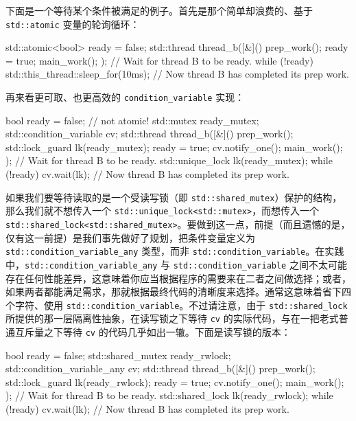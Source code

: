 下面是一个等待某个条件被满足的例子。首先是那个简单却浪费的、基于 \texttt{std::\allowbreak{}atomic} 变量的轮询循环：

\begin{codebox}[cpp]
    std::atomic<bool> ready = false;
    std::thread thread_b([&]() {
      prep_work();
      ready = true;
      main_work();
    });
    // Wait for thread B to be ready.
    while (!ready) {
      std::this_thread::sleep_for(10ms);
    }
    // Now thread B has completed its prep work.
\end{codebox}

再来看更可取、也更高效的 \texttt{condition\_\allowbreak{}variable} 实现：

\begin{codebox}[cpp]
    bool ready = false; // not atomic!
    std::mutex ready_mutex;
    std::condition_variable cv;
    std::thread thread_b([&]() {
      prep_work();
      {
        std::lock_guard lk(ready_mutex);
        ready = true;
      }
      cv.notify_one();
      main_work();
    });
    // Wait for thread B to be ready.
    {
      std::unique_lock lk(ready_mutex);
      while (!ready) {
        cv.wait(lk);
      }
    }
    // Now thread B has completed its prep work.
\end{codebox}

如果我们要等待读取的是一个受读写锁（即 \texttt{std::\allowbreak{}shared\_\allowbreak{}mutex}）保护的结构，那么我们就不想传入一个 \texttt{std::\allowbreak{}unique\_\allowbreak{}lock<\allowbreak{}std::\allowbreak{}mutex>\allowbreak{}}，而想传入一个 \texttt{std::\allowbreak{}shared\_\allowbreak{}lock<\allowbreak{}std::\allowbreak{}shared\_\allowbreak{}mutex>\allowbreak{}}。要做到这一点，前提（而且遗憾的是，仅有这一前提）是我们事先做好了规划，把条件变量定义为 \texttt{std::\allowbreak{}condition\_\allowbreak{}variable\_\allowbreak{}any} 类型，而非 \texttt{std::\allowbreak{}condition\_\allowbreak{}variable}。在实践中，\texttt{std::\allowbreak{}condition\_\allowbreak{}variable\_\allowbreak{}any} 与 \texttt{std::\allowbreak{}condition\_\allowbreak{}variable} 之间不太可能存在任何性能差异，这意味着你应当根据程序的需要来在二者之间做选择；或者，如果两者都能满足需求，那就根据最终代码的清晰度来选择。通常这意味着省下四个字符、使用 \texttt{std::\allowbreak{}condition\_\allowbreak{}variable}。不过请注意，由于 \texttt{std::\allowbreak{}shared\_\allowbreak{}lock} 所提供的那一层隔离性抽象，在读写锁之下等待 \texttt{cv} 的实际代码，与在一把老式普通互斥量之下等待 \texttt{cv} 的代码几乎如出一辙。下面是读写锁的版本：

\begin{codebox}[cpp]
    bool ready = false;
    std::shared_mutex ready_rwlock;
    std::condition_variable_any cv;
    std::thread thread_b([&]() {
      prep_work();
      {
        std::lock_guard lk(ready_rwlock);
        ready = true;
      }
      cv.notify_one();
      main_work();
    });
    // Wait for thread B to be ready.
    {
      std::shared_lock lk(ready_rwlock);
      while (!ready) {
        cv.wait(lk);
      }
    }
    // Now thread B has completed its prep work.
\end{codebox}

